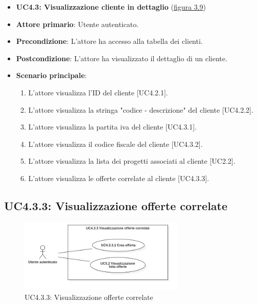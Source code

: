 \begin{itemize}
\item \textbf{UC4.3: Visualizzazione cliente in dettaglio} ({\hyperref[fig:UC4.3]{figura 3.9}})
\item \textbf{Attore primario}: Utente autenticato.
\item \textbf{Precondizione}: L'attore ha accesso alla tabella dei clienti.
\item \textbf{Postcondizione}: L'attore ha visualizzato il dettaglio di un cliente.
\item \textbf{Scenario principale}: 
\begin{enumerate}
\item L'attore visualizza l'ID del cliente [UC4.2.1].
\item L'attore visualizza la stringa "codice - descrizione" del cliente [UC4.2.2].
\item L'attore visualizza la partita iva del cliente [UC4.3.1].
\item L'attore visualizza il codice fiscale del cliente [UC4.3.2].
\item L'attore visualizza la lista dei progetti associati al cliente [UC2.2].
\item L'attore visualizza le offerte correlate al cliente [UC4.3.3].
\end{enumerate}
\end{itemize}

\subsection{UC4.3.3: Visualizzazione offerte correlate}
\begin{figure}[!h]
\centering
\includegraphics[width=300px]{../images/UC/.jpeg/UC4.3.3.0-visualizzazioneOfferteCorrelate.jpg}
\caption{UC4.3.3: Visualizzazione offerte correlate}
\label{fig:UC4.3.3}
\end{figure}

